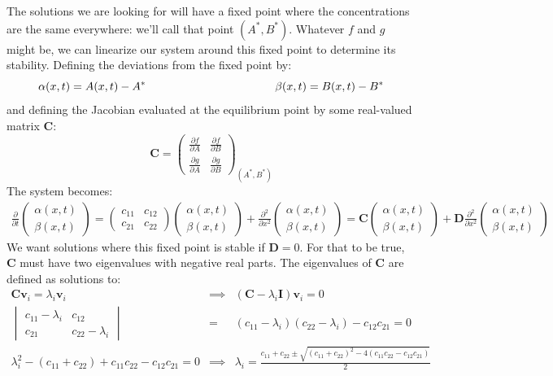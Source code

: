 \documentclass{article}
\begin{document}
The solutions we are looking for will have a fixed point where the concentrations are the same everywhere: we'll call that point $(A^*,B^*)$. Whatever $f$ and $g$ might be, we can linearize our system around this fixed point to determine its stability. Defining the deviations from the fixed point by:
\[ \alpha(x,t) = A(x,t) - A^* \hspace{4 cm} \beta(x,t) = B(x,t) - B^*\]
and defining the Jacobian evaluated at the equilibrium point by some real-valued matrix $\mathbf{C}$:
\[ \mathbf{C} = \begin{pmatrix} \frac{\partial f}{\partial A} & \frac{\partial f}{\partial B}\\ \frac{\partial g}{\partial A} & \frac{\partial g}{\partial B} \end{pmatrix}_{(A^*, B^*)} \]
The system becomes:
\begin{eqnarray}
 \frac{\partial }{\partial t} \begin{pmatrix} \alpha (x,t) \\ \beta (x,t) \end{pmatrix} =  \begin{pmatrix} c_{11} & c_{12} \\ c_{21} & c_{22} \end{pmatrix} \begin{pmatrix} \alpha (x,t) \\ \beta (x,t) \end{pmatrix} + \frac{\partial^2}{\partial x^2} \begin{pmatrix} \alpha (x,t) \\ \beta(x,t) \end{pmatrix} = \mathbf{C}  \begin{pmatrix} \alpha (x,t) \\ \beta (x,t) \end{pmatrix} + \mathbf{D} \frac{\partial^2}{\partial x^2}  \begin{pmatrix} \alpha (x,t) \\ \beta (x,t) \end{pmatrix} \label{eqn:turing}
 \end{eqnarray}
We want solutions where this fixed point is stable if $\mathbf{D}=0$. For that to be true, $\mathbf{C}$ must have two eigenvalues with negative real parts. The eigenvalues of $\mathbf{C}$ are defined as solutions to:
\begin{eqnarray*}
  \mathbf{C} \mathbf{v}_i = \lambda_i \mathbf{v}_i & \implies & \left( \mathbf{C} - \lambda_i \mathbf{I} \right) \mathbf{v}_i = 0\\
  \begin{vmatrix} c_{11} - \lambda_i & c_{12}\\c_{21} & c_{22} - \lambda_i \end{vmatrix} & = & \left(c_{11} - \lambda_i \right)\left(c_{22} - \lambda_i \right) - c_{12} c_{21} =  0\\
  \lambda_i^2 - \left(c_{11} + c_{22} \right) + c_{11}c_{22} - c_{12} c_{21} = 0 & \implies & \lambda_i = \frac{c_{11} + c_{22}  \pm \sqrt{\left(c_{11} + c_{22} \right) ^2 - 4 \left( c_{11}c_{22} - c_{12} c_{21} \right)}}{2}
\end{eqnarray*} 
\end{document}
